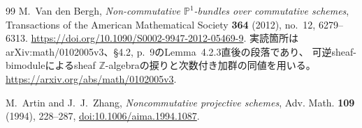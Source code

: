 \begin{thebibliography}{99}
M.~Van den Bergh,
\emph{Non-commutative $\mathbb P^1$-bundles over commutative schemes},
Transactions of the American Mathematical Society \textbf{364} (2012), no.~12, 6279--6313.
\url{https://doi.org/10.1090/S0002-9947-2012-05469-9}.
実読箇所はarXiv:math/0102005v3、\S4.2, p.~9のLemma~4.2.3直後の段落であり、
可逆sheaf-bimoduleによるsheaf $\mathbb Z$-algebraの捩りと次数付き加群の同値を用いる。
\url{https://arxiv.org/abs/math/0102005v3}.

M.~Artin and J.~J.~Zhang,
\emph{Noncommutative projective schemes},
Adv. Math. \textbf{109} (1994), 228--287,
\href{https://doi.org/10.1006/aima.1994.1087}{doi:10.1006/aima.1994.1087}.
\end{thebibliography}
